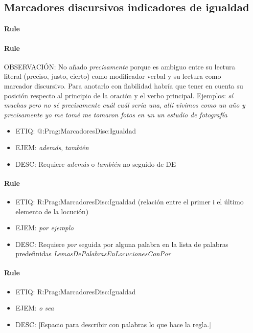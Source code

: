 \documentclass[11pt]{report}
\begin{document}
\subsection{Marcadores discursivos indicadores de igualdad}
\paragraph*{Rule}
\paragraph*{Rule}
OBSERVACIÓN: No añado \emph{precisamente} porque es ambiguo entre su lectura literal (preciso, justo, cierto) como modificador verbal y su lectura como marcador discursivo. Para anotarlo con fiabilidad habría que tener en cuenta su posición respecto al principio de la oración y el verbo principal. Ejemplos: \emph{sí muchas pero no sé precisamente cuál cuál sería una}, \emph{allí vivimos como un año y precisamente yo me tomé me tomaron fotos en un un estudio de fotografía}

\begin{itemize}
\item ETIQ: @:Prag:MarcadoresDisc:Igualdad
\item EJEM: \emph{además}, \emph{también}
\item DESC: Requiere \emph{además} o \emph{también} no seguido de DE
\end{itemize}

\paragraph*{Rule}
\begin{itemize}
\item ETIQ: R:Prag:MarcadoresDisc:Igualdad (relación entre el primer i el último elemento de la locución)
\item EJEM: \emph{por ejemplo}
\item DESC: Requiere \emph{por} seguida por alguna palabra en la lista de palabras predefinidas \emph{LemasDePalabrasEnLocucionesConPor}
\end{itemize}

\paragraph*{Rule}
\begin{itemize}
\item ETIQ: R:Prag:MarcadoresDisc:Igualdad
\item EJEM: \emph{o sea}
\item DESC: [Espacio para describir con palabras lo que hace la regla.]
\end{itemize}
\end{document}
